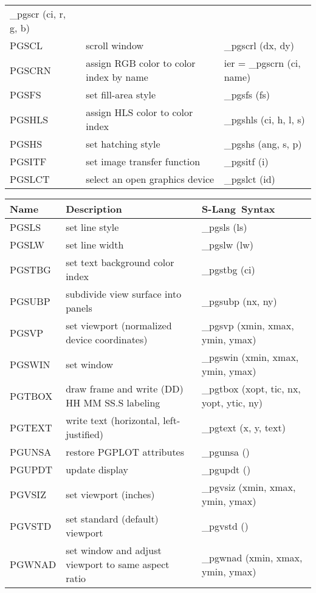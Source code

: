 \documentclass{book}
\newcommand{\slang}{{\sc S-Lang}}
\begin{document}
\begin{center}
\begin{tabular}{|l|p{2.5in}|p{2.25in}|}
\_pgscr (ci, r, g, b) \\
PGSCL & scroll window                    &
\_pgscrl (dx, dy) \\
PGSCRN & assign RGB color to color index by name               &
ier = \_pgscrn (ci, name) \\
PGSFS & set fill-area style                                             &
\_pgsfs (fs) \\
PGSHLS & assign HLS color to color index                          &
\_pgshls (ci, h, l, s) \\
PGSHS & set hatching style                                              &
\_pgshs (ang, s, p) \\
PGSITF & set image transfer function                                    &
\_pgsitf (i) \\
PGSLCT & select an open graphics device                                 &
\_pgslct (id) \\
\hline
\end{tabular}

\begin{tabular}{|l|p{2.5in}|p{2.25in}|}
\hline
Name &  Description & \slang\ Syntax \\
\hline
\hline
PGSLS & set line style                                                  &
\_pgsls (ls) \\
PGSLW & set line width                                                  &
\_pgslw (lw) \\
PGSTBG & set text background color index                                &
\_pgstbg (ci) \\
PGSUBP & subdivide view surface into panels                             &
\_pgsubp (nx, ny) \\
PGSVP & set viewport (normalized device coordinates)                    &
\_pgsvp (xmin, xmax, ymin, ymax) \\
PGSWIN & set window                                                     &
\_pgswin (xmin, xmax, ymin, ymax) \\
PGTBOX & draw frame and write (DD) HH MM SS.S labeling                 &
\_pgtbox (xopt, tic, nx, yopt, ytic, ny) \\
PGTEXT & write text (horizontal, left-justified)                        &
\_pgtext (x, y, text) \\
PGUNSA & restore PGPLOT attributes                                      &
\_pgunsa () \\
PGUPDT & update display                                                 &
\_pgupdt () \\
PGVSIZ & set viewport (inches)                                          &
\_pgvsiz (xmin, xmax, ymin, ymax) \\
PGVSTD & set standard (default) viewport                                &
\_pgvstd () \\
PGWNAD & set window and adjust viewport to same aspect ratio            &
\_pgwnad (xmin, xmax, ymin, ymax) \\
\hline
\end{tabular}
\end{center}
\end{document}
